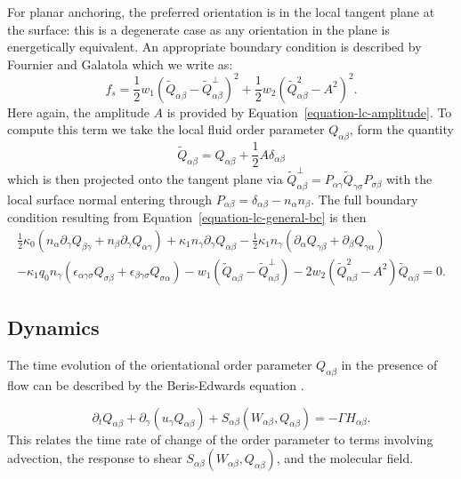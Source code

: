 For planar anchoring, the preferred orientation is in the local tangent
plane at the surface: this is a degenerate case as any orientation in
the plane is energetically equivalent. An appropriate boundary
condition is described by Fournier and Galatola \cite{fournier2005}
which we write as:
\begin{equation}
f_s =
{\textstyle\frac{1}{2}} w_1 (\tilde{Q}_{\alpha\beta} - \tilde{Q}^\perp_{\alpha\beta})^2
+ {\textstyle\frac{1}{2}} w_2 (\tilde{Q}_{\alpha\beta}^2 - A^2)^2.
\end{equation}
Here again, the amplitude $A$ is provided by
Equation~\ref{equation-lc-amplitude}. To compute this term we take
the local fluid order parameter $Q_{\alpha\beta}$, form the quantity
$$
\tilde{Q}_{\alpha\beta}
= Q_{\alpha\beta} + {\textstyle \frac{1}{2}A\delta_{\alpha\beta} }
$$
which is then projected onto the tangent plane via
$
\tilde{Q}^\perp_{\alpha\beta}
= P_{\alpha\gamma} \tilde{Q}_{\gamma\sigma} P_{\sigma\beta}
$
with the local surface normal entering through
$P_{\alpha\beta} = \delta_{\alpha\beta} - n_\alpha n_\beta$.
The full boundary condition resulting from
Equation~\ref{equation-lc-general-bc} is then
\begin{eqnarray}
{\textstyle\frac{1}{2}} \kappa_0 (n_\alpha \partial_\gamma Q_{\beta\gamma}
+ n_\beta \partial_\gamma Q_{\alpha\gamma})
+ \kappa_1 n_\gamma \partial_\gamma Q_{\alpha\beta}
- {\textstyle\frac{1}{2}} \kappa_1 n_\gamma ( \partial_\alpha Q_{\gamma\beta}
+ \partial_\beta Q_{\gamma\alpha})
\nonumber
\\
- \kappa_1 q_0 n_\gamma (\epsilon_{\alpha\gamma\sigma} Q_{\sigma\beta}
+ \epsilon_{\beta\gamma\sigma}Q_{\sigma\alpha})
- w_1 (\tilde{Q}_{\alpha\beta} - \tilde{Q}_{\alpha\beta}^\perp)
- 2w_2(\tilde{Q}_{\alpha\beta}^2 - A^2)\tilde{Q}_{\alpha\beta} = 0.
\label{equation-lc-bc-planar}
\end{eqnarray}



\subsection{Dynamics}

The time evolution of the orientational order parameter $Q_{\alpha\beta}$
in the presence of flow can be described by the Beris-Edwards equation
\cite{beris-edwards}.

\begin{equation}
\partial_t Q_{\alpha\beta} + \partial_\gamma (u_\gamma Q_{\alpha\beta})
+ S_{\alpha\beta}(W_{\alpha\beta}, Q_{\alpha\beta}) = -\Gamma  H_{\alpha\beta}.
\label{equation-lc-beris-edwards}
\end{equation}
This relates the time rate of change of the order parameter to terms
involving advection, the response to shear
$S_{\alpha\beta}(W_{\alpha\beta},Q_{\alpha\beta})$, and the molecular
field.

